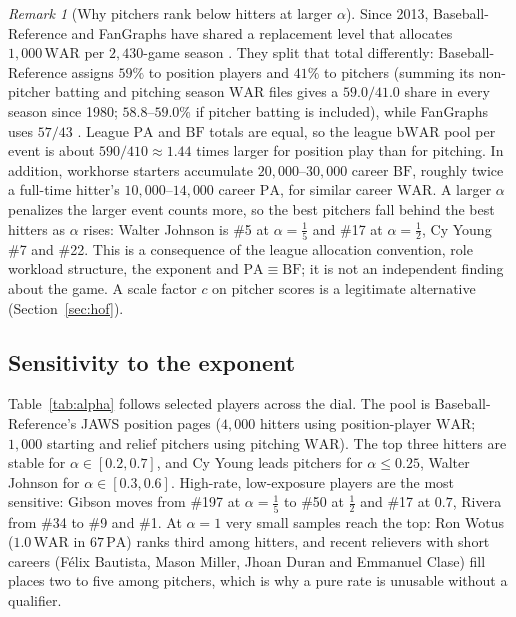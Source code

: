 \documentclass[11pt,letterpaper]{article}
\theoremstyle{plain}
\theoremstyle{definition}
\theoremstyle{remark}
\newtheorem{remark}{Remark}
\newcommand{\WAR}{\mathrm{WAR}}
\newcommand{\PA}{\mathrm{PA}}
\newcommand{\BF}{\mathrm{BF}}
\begin{document}
\begin{remark}[Why pitchers rank below hitters at larger $\alpha$]
\label{rem:mvp}
Since 2013, Baseball-Reference and FanGraphs have shared a replacement level that allocates $1{,}000\,\WAR$ per $2{,}430$-game season \cite{bbrefwar,cameron2013}. They split that total differently: Baseball-Reference assigns $59\%$ to position players and $41\%$ to pitchers (summing its non-pitcher batting and pitching season $\WAR$ files gives a $59.0/41.0$ share in every season since 1980; $58.8$--$59.0\%$ if pitcher batting is included), while FanGraphs uses $57/43$ \cite{appelman2013}. League $\PA$ and $\BF$ totals are equal, so the league $\mathrm{bWAR}$ pool per event is about $590/410 \approx 1.44$ times larger for position play than for pitching. In addition, workhorse starters accumulate $20{,}000$--$30{,}000$ career $\BF$, roughly twice a full-time hitter's $10{,}000$--$14{,}000$ career $\PA$, for similar career $\WAR$. A larger $\alpha$ penalizes the larger event counts more, so the best pitchers fall behind the best hitters as $\alpha$ rises: Walter Johnson is \#5 at $\alpha = \tfrac15$ and \#17 at $\alpha = \tfrac12$, Cy Young \#7 and \#22. This is a consequence of the league allocation convention, role workload structure, the exponent and $\PA \equiv \BF$; it is not an independent finding about the game. A scale factor $c$ on pitcher scores is a legitimate alternative (Section~\ref{sec:hof}).
\end{remark}

\subsection{Sensitivity to the exponent}
\label{sec:sens}

Table~\ref{tab:alpha} follows selected players across the dial. The pool is Baseball-Reference's JAWS position pages ($4{,}000$ hitters using position-player $\WAR$; $1{,}000$ starting and relief pitchers using pitching $\WAR$). The top three hitters are stable for $\alpha \in [0.2, 0.7]$, and Cy Young leads pitchers for $\alpha \le 0.25$, Walter Johnson for $\alpha \in [0.3, 0.6]$. High-rate, low-exposure players are the most sensitive: Gibson moves from \#197 at $\alpha = \tfrac15$ to \#50 at $\tfrac12$ and \#17 at $0.7$, Rivera from \#34 to \#9 and \#1. At $\alpha = 1$ very small samples reach the top: Ron Wotus ($1.0\,\WAR$ in $67\,\PA$) ranks third among hitters, and recent relievers with short careers (F\'{e}lix Bautista, Mason Miller, Jhoan Duran and Emmanuel Clase) fill places two to five among pitchers, which is why a pure rate is unusable without a qualifier.
\end{document}
